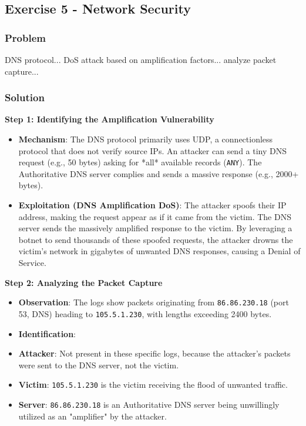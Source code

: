 \documentclass{article}
\begin{document}
\subsection{Exercise 5 - Network Security}
\subsubsection*{Problem}
DNS protocol... DoS attack based on amplification factors... analyze packet capture...

\subsubsection*{Solution}
\textbf{Step 1: Identifying the Amplification Vulnerability}
\begin{itemize}
    \item \textbf{Mechanism}: The DNS protocol primarily uses UDP, a connectionless protocol that does not verify source IPs. An attacker can send a tiny DNS request (e.g., 50 bytes) asking for *all* available records (\texttt{ANY}). The Authoritative DNS server complies and sends a massive response (e.g., 2000+ bytes).
    \item \textbf{Exploitation (DNS Amplification DoS)}: The attacker spoofs their IP address, making the request appear as if it came from the victim. The DNS server sends the massively amplified response to the victim. By leveraging a botnet to send thousands of these spoofed requests, the attacker drowns the victim's network in gigabytes of unwanted DNS responses, causing a Denial of Service.

\end{itemize}
\textbf{Step 2: Analyzing the Packet Capture}
\begin{itemize}
    \item \textbf{Observation}: The logs show packets originating from \texttt{86.86.230.18} (port 53, DNS) heading to \texttt{105.5.1.230}, with lengths exceeding 2400 bytes.
    \item \textbf{Identification}:
    \item \textbf{Attacker}: Not present in these specific logs, because the attacker's packets were sent to the DNS server, not the victim.
    \item \textbf{Victim}: \texttt{105.5.1.230} is the victim receiving the flood of unwanted traffic.
    \item \textbf{Server}: \texttt{86.86.230.18} is an Authoritative DNS server being unwillingly utilized as an "amplifier" by the attacker.

\end{itemize}
\end{document}

